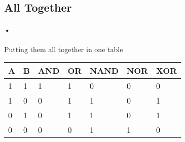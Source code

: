 \documentclass[11pt]{article}
\begin{document}
\subsection{All Together}
\paragraph{•} Putting them all together in one table

\begin{tabular}{lll|l|l|l|l}
A  & B & AND & OR & NAND & NOR & XOR \\
\hline
1 & 1 & 1 & 1 & 0 & 0 & 0 \\
1 & 0 & 0 & 1 & 1 & 0 & 1 \\
0 & 1 & 0 & 1 & 1 & 0 & 1 \\
0 & 0 & 0 & 0 & 1 & 1 & 0 \\
\hline
\end{tabular}




\end{document}
